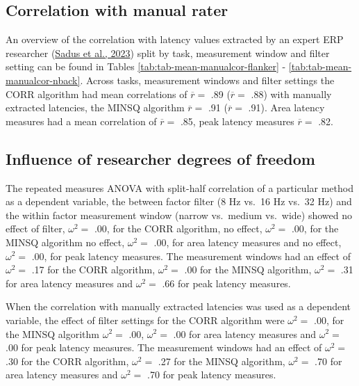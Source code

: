 \documentclass[
  man]{apa7}
\begin{document}
\hypertarget{correlation-with-manual-rater}{%
\subsection{Correlation with manual rater}\label{correlation-with-manual-rater}}

An overview of the correlation with latency values extracted by an expert ERP researcher (\protect\hyperlink{ref-sadus2023multiverse}{Sadus et al., 2023}) split by task, measurement window and filter setting can be found in Tables \ref{tab:tab-mean-manualcor-flanker} - \ref{tab:tab-mean-manualcor-nback}. Across tasks, measurement windows and filter settings the CORR algorithm had mean correlations of \(\overline{r} =\) .89 (\(\overline{r} =\) .88) with manually extracted latencies, the MINSQ algorithm \(\overline{r} =\) .91 (\(\overline{r} =\) .91). Area latency measures had a mean correlation of \(\overline{r} =\) .85, peak latency measures \(\overline{r} =\) .82.

\hypertarget{influence-of-researcher-degrees-of-freedom}{%
\subsection{Influence of researcher degrees of freedom}\label{influence-of-researcher-degrees-of-freedom}}

The repeated measures ANOVA with split-half correlation of a particular method as a dependent variable, the between factor filter (8 Hz vs.~16 Hz vs.~32 Hz) and the within factor measurement window (narrow vs.~medium vs.~wide) showed no effect of filter, \(\omega^2 =\) .00, for the CORR algorithm, no effect, \(\omega^2 =\) .00, for the MINSQ algorithm no effect, \(\omega^2 =\) .00, for area latency measures and no effect, \(\omega^2 =\) .00, for peak latency measures. The measurement windows had an effect of \(\omega^2 =\) .17 for the CORR algorithm, \(\omega^2 =\) .00 for the MINSQ algorithm, \(\omega^2 =\) .31 for area latency measures and \(\omega^2 =\) .66 for peak latency measures.

When the correlation with manually extracted latencies was used as a dependent variable, the effect of filter settings for the CORR algorithm were \(\omega^2 =\) .00, for the MINSQ algorithm \(\omega^2 =\) .00, \(\omega^2 =\) .00 for area latency measures and \(\omega^2 =\) .00 for peak latency measures. The measurement windows had an effect of \(\omega^2 =\) .30 for the CORR algorithm, \(\omega^2 =\) .27 for the MINSQ algorithm, \(\omega^2 =\) .70 for area latency measures and \(\omega^2 =\) .70 for peak latency measures.
\end{document}

